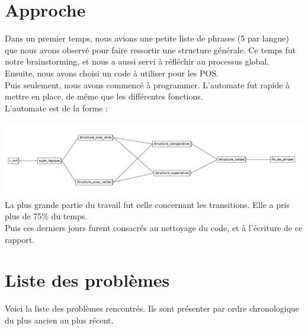 \section{Approche}


Dans un premier temps, nous avions une petite liste de phrases (5 par langue) que nous avons observé pour faire ressortir une structure générale. Ce temps fut notre brainstorming, et nous a aussi servi à réfléchir au processus global. \\

Ensuite, nous avons choisi un code à utiliser pour les POS. \\

Puis seulement, nous avons commencé à programmer. L'automate fut rapide à mettre en place, de même que les différentes fonctions. \\

L'automate est de la forme :

\includegraphics[width=1\linewidth]{./chap/img/dfa.png} \\

La plus grande partie du travail fut celle concernant les transitions. Elle a pris plus de 75\% du temps. \\

Puis ces derniers jours furent consacrés au nettoyage du code, et à l'écriture de ce rapport. \\

\newpage
\section{Liste des problèmes}

Voici la liste des problèmes rencontrés. Ils sont présenter par ordre chronologique du plus ancien au plus récent. \\

